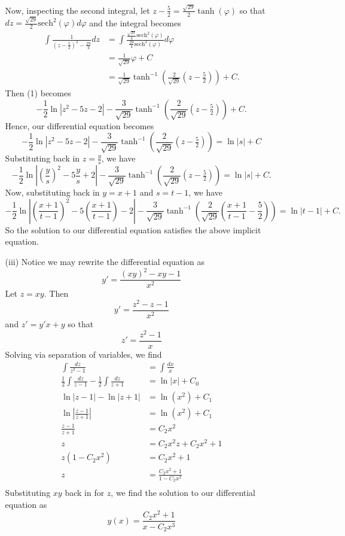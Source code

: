 \documentclass{article}
\begin{document}
\begin{itemize}
\begin{itemize}
        Now, inspecting the second integral, let $z - \tfrac{5}{2} = \tfrac{\sqrt{29}}{2}\tanh(\varphi)$ so that $dz = \tfrac{\sqrt{29}}{2}\text{sech}^2(\varphi)d\varphi$ and the integral becomes
        \begin{align*}
            \int \frac{1}{\left(z - \tfrac{5}{2}\right)^2 - \tfrac{29}{4}}dz &= \int \frac{\tfrac{\sqrt{29}}{4}\text{sech}^2(\varphi)}{\tfrac{29}{4}\text{sech}^2(\varphi)}d\varphi\\
            &= \frac{1}{\sqrt{29}}\varphi + C\\
            &= \frac{1}{\sqrt{29}}\tanh^{-1}\left(\frac{2}{\sqrt{29}}(z - \tfrac{5}{2})\right) + C.
        \end{align*}
        Then (1) becomes 
        \[-\frac{1}{2}\ln|z^2 - 5z - 2| - \frac{3}{\sqrt{29}}\tanh^{-1}\left(\frac{2}{\sqrt{29}}(z - \tfrac{5}{2})\right) + C.\]
        Hence, our differential equation becomes
        \[-\frac{1}{2}\ln|z^2 - 5z - 2| - \frac{3}{\sqrt{29}}\tanh^{-1}\left(\frac{2}{\sqrt{29}}(z - \tfrac{5}{2})\right)= \ln|s| + C\]
        Substituting back in $z = \tfrac{y}{s}$, we have
        \[-\frac{1}{2}\ln\left|\left(\frac{y}{s}\right)^2 - 5\frac{y}{s} + 2\right| - \frac{3}{\sqrt{29}}\tanh^{-1}\left(\frac{2}{\sqrt{29}}(z - \tfrac{5}{2})\right) = \ln|s| + C.\]
        Now, substituting back in $y = x + 1$ and $s = t - 1$, we have
        \[-\frac{1}{2}\ln\left|\left(\frac{x+1}{t-1}\right)^2 - 5\left(\frac{x+1}{t-1}\right) - 2\right| - \frac{3}{\sqrt{29}}\tanh^{-1}\left(\frac{2}{\sqrt{29}}\left(\frac{x+1}{t-1} - \frac{5}{2}\right)\right) = \ln|t - 1| + C.\]
        So the solution to our differential equation satisfies the above implicit equation.
        \newline\newline
        

        \item[(iii)] Notice we may rewrite the differential equation as 
        \[y' = \frac{(xy)^2 - xy - 1}{x^2}\]
        Let $z = xy$. Then
        \[y' = \frac{z^2 - z - 1}{x^2}\]
        and $z' = y'x + y$ so that 
        \[z' = \frac{z^2 - 1}{x}\]
        Solving via separation of variables, we find
        \begin{align*}
            \int\frac{dz}{z^2 - 1} &= \int\frac{dx}{x}\\
            \frac{1}{2}\int\frac{dz}{z - 1} - \frac{1}{2}\int\frac{dz}{z+1} &= \ln|x| + C_0\\
            \ln|z-1| - \ln|z + 1| &= \ln(x^2) + C_1\\
            \ln\left|\frac{z-1}{z+1}\right| &= \ln(x^2) + C_1\\
            \frac{z-1}{z+1} &= C_2x^2\\
            z &= C_2x^2z + C_2x^2 + 1\\
            z(1 - C_2x^2) &= C_2x^2 + 1\\
            z &= \frac{C_2x^2 + 1}{1 - C_2x^2}\\
        \end{align*}
        Substituting $xy$ back in for $z$, we find the solution to our differential equation as
        \[y(x) = \frac{C_2x^2 + 1}{x - C_2x^3}\]
        


\end{itemize}
\end{itemize}
\end{document}
